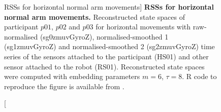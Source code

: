 \begin{figure}
\caption
	[RSSs for horizontal normal arm movements]{
	{\bf RSSs for horizontal normal arm movements.}
	Reconstructed state spaces %
	of participant $p01$, $p02$ and $p03$ for horizontal movements 
	with raw-normalised (sg0zmuvGyroZ), 
	normalised-smoothed 1 (sg1zmuvGyroZ) and 
	normalised-smoothed 2 (sg2zmuvGyroZ) time series of the 
	sensors attached to the participant (HS01) and other sensor 
	attached to the robot (RS01).	
	Reconstructed state spaces were computed with 
	embedding parameters $m=6$, $\tau=8$.
	R code to reproduce the figure is available from \cite{hwum2018}.
        }
    \label{fig:rss_HN}
\end{figure}

